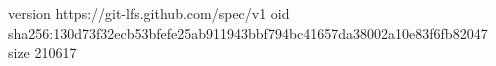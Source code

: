 version https://git-lfs.github.com/spec/v1
oid sha256:130d73f32ecb53bfefe25ab911943bbf794bc41657da38002a10e83f6fb82047
size 210617
